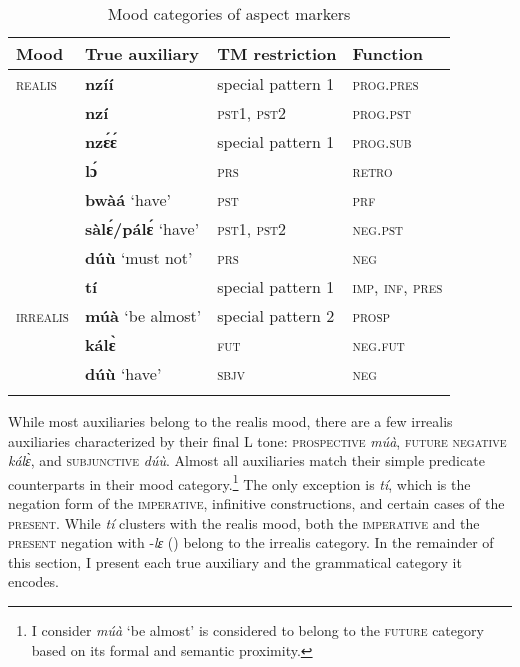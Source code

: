 \begin{table}
\begin{tabular}{llll}
 \lsptoprule
Mood               & True auxiliary & TM  restriction         & Function\\\midrule
\textsc{realis}  &  {\bfseries nzíí} & special pattern 1 & \textsc{prog.pres} \\
                       & {\bfseries nzí} & \textsc{pst1, pst2} & \textsc{prog.pst} \\
                       & {\bfseries nzɛ́ɛ́} & special pattern 1 & \textsc{prog.sub} \\
                       &   {\bfseries lɔ́} & \textsc{prs} & \textsc{retro} \\
                       & {\bfseries bwàá} `have' & \textsc{pst} & \textsc{prf}\\ 
                       & {\bfseries sàlɛ́/pálɛ́} `have' & \textsc{pst1, pst2} & \textsc{neg.pst}\\ 
                       & {\bfseries dúù} `must not' & \textsc{prs} & \textsc{neg}\\ 
                       & {\bfseries tí}  & special pattern 1 & \textsc{imp, inf, pres}\\ 
  \midrule
\textsc{irrealis} & {\bfseries múà} `be almost'  &  special pattern 2 & \textsc{prosp}   \\
                       & {\bfseries kálɛ̀} & \textsc{fut} & \textsc{neg.fut}\\ 
                       & {\bfseries dúù} `have' & \textsc{sbjv} & \textsc{neg}\\ 
 \lspbottomrule
\end{tabular}
\caption{Mood categories of aspect markers}
\label{Tab:AM}
\end{table} 

While most auxiliaries belong to the realis mood, there are a few irrealis auxiliaries characterized by their final L tone: \textsc{prospective} {\itshape múà}, \textsc{future negative} {\itshape kálɛ̀}, and \textsc{subjunctive} {\itshape dúù}. Almost all auxiliaries match their simple predicate counterparts in their mood category.\footnote{I consider {\itshape múà} `be almost' is considered to belong to the \textsc{future} category based on its formal and semantic proximity.} The only exception is {\itshape tí}, which is the negation form of the \textsc{imperative}, infinitive constructions, and certain cases of the \textsc{present}. While {\itshape tí} clusters with the realis mood, both the \textsc{imperative} and the \textsc{present} negation with -{\itshape lɛ} () belong to the irrealis category. 
In the remainder of this section, I present each true auxiliary and the grammatical category it encodes.





